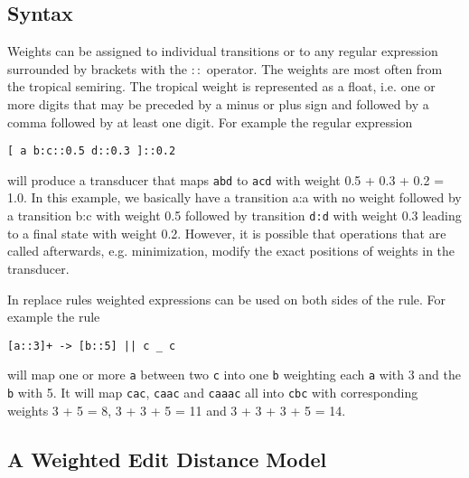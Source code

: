 \documentclass{llncs}
\begin{document}
\subsection{Syntax}

Weights can be assigned to individual transitions or to any regular expression surrounded by brackets
with the $::$ operator. The weights are most often from the tropical semiring. The tropical weight is
represented as a float, i.e. one or more digits that may be preceded by a minus or plus sign and followed
by a comma followed by at least one digit. For example the regular expression

\begin{center}
\begin{framed}
\begin{verbatim}
[ a b:c::0.5 d::0.3 ]::0.2
\end{verbatim}
\end{framed}
\end{center}

\noindent will produce a transducer that maps {\tt abd} to {\tt acd} with weight 0.5 + 0.3 + 0.2 = 1.0. In this example,
we basically have a transition a:a with no weight followed by a transition b:c with weight 0.5
followed by transition {\tt d:d} with weight 0.3 leading to a final state with weight 0.2. However, it is
possible that operations that are called afterwards, e.g. minimization, modify the exact positions
of weights in the transducer. 

In replace rules weighted expressions can be used on both sides of the rule.
For example the rule

\begin{center}
\begin{framed}
\begin{verbatim}
[a::3]+ -> [b::5] || c _ c
\end{verbatim}
\end{framed}
\end{center}

\noindent will map one or more {\tt a} between two {\tt c} into one {\tt b} weighting each {\tt a} with 3
and the {\tt b} with 5. It will map {\tt cac}, {\tt caac} and {\tt caaac} all into {\tt cbc} with
corresponding weights 3 + 5 = 8, 3 + 3 + 5 = 11 and 3 + 3 + 3 + 5 = 14.

\subsection{A Weighted Edit Distance Model}
\end{document}

